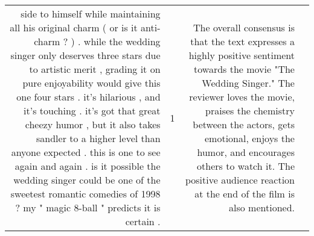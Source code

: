 \begin{tabular}{r{1cm} p{0.4in} r{1cm} p{0.4in}}
side to himself while maintaining all his original charm ( or is it anti-charm ? ) .  while the wedding singer only deserves three stars due to artistic merit , grading it on pure enjoyability would give this one four stars .  it's hilarious , and it's touching .  it's got that great cheezy humor , but it also takes sandler to a higher level than anyone expected .  this is one to see again and again .  is it possible the wedding singer could be one of the sweetest romantic comedies of 1998 ?  my " magic 8-ball " predicts it is certain .   & 1 & The overall consensus is that the text expresses a highly positive sentiment towards the movie "The Wedding Singer." The reviewer loves the movie, praises the chemistry between the actors, gets emotional, enjoys the humor, and encourages others to watch it. The positive audience reaction at the end of the film is also mentioned. \\

\end{tabular}

